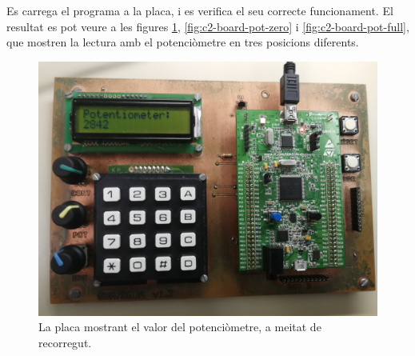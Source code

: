 Es carrega el programa a la placa, i es verifica el seu correcte funcionament.
El resultat es pot veure a les figures \ref{fig:c2-board-pot-mid}, \ref{fig:c2-board-pot-zero}
i \ref{fig:c2-board-pot-full}, que mostren la lectura amb el potenciòmetre en tres posicions diferents.

\begin{figure}[bh]
  \includegraphics[width=.99\columnwidth]{../photos/board/c2-pot-mid}
  \caption{ \label{fig:c2-board-pot-mid} La placa mostrant el valor del potenciòmetre, a meitat de recorregut. }
\end{figure}

